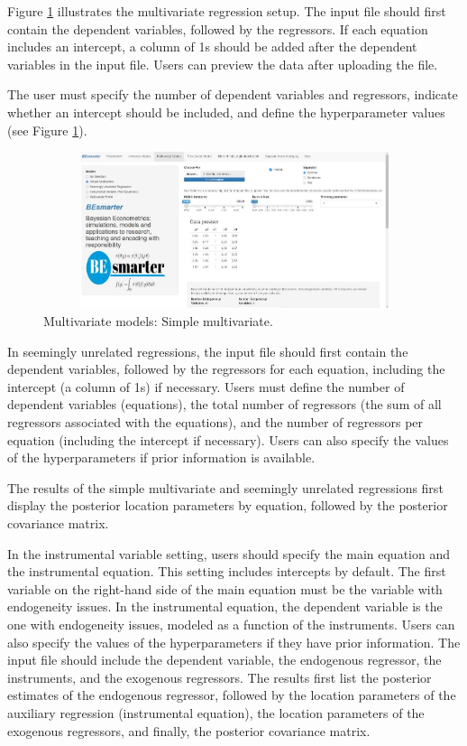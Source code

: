 Figure \ref{fig66} illustrates the multivariate regression setup. The input file should first contain the dependent variables, followed by the regressors. If each equation includes an intercept, a column of 1s should be added after the dependent variables in the input file. Users can preview the data after uploading the file.

The user must specify the number of dependent variables and regressors, indicate whether an intercept should be included, and define the hyperparameter values (see Figure \ref{fig66}).

\begin{figure}
	\includegraphics[width=340pt, height=130pt]{Chapters/chapterGUI/figures/Figure6.jpg}
	\caption[List of figure caption goes here]{Multivariate models: Simple multivariate.}\label{fig66}
\end{figure}

In seemingly unrelated regressions, the input file should first contain the dependent variables, followed by the regressors for each equation, including the intercept (a column of 1s) if necessary. Users must define the number of dependent variables (equations), the total number of regressors (the sum of all regressors associated with the equations), and the number of regressors per equation (including the intercept if necessary). Users can also specify the values of the hyperparameters if prior information is available.

The results of the simple multivariate and seemingly unrelated regressions first display the posterior location parameters by equation, followed by the posterior covariance matrix.

In the instrumental variable setting, users should specify the main equation and the instrumental equation. This setting includes intercepts by default. The first variable on the right-hand side of the main equation must be the variable with endogeneity issues. In the instrumental equation, the dependent variable is the one with endogeneity issues, modeled as a function of the instruments. Users can also specify the values of the hyperparameters if they have prior information. The input file should include the dependent variable, the endogenous regressor, the instruments, and the exogenous regressors. The results first list the posterior estimates of the endogenous regressor, followed by the location parameters of the auxiliary regression (instrumental equation), the location parameters of the exogenous regressors, and finally, the posterior covariance matrix.

